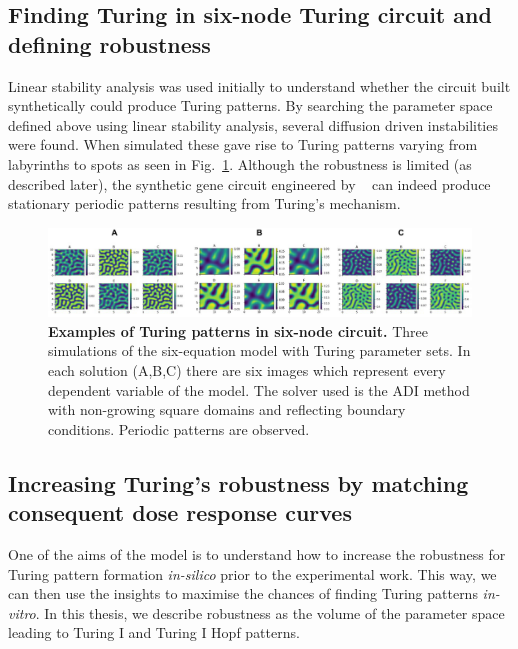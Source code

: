 \subsection{Finding Turing in six-node Turing circuit and defining robustness}
Linear stability analysis was used initially to understand whether the circuit built synthetically could produce Turing patterns.
By searching the parameter space defined above using linear stability analysis, several diffusion driven instabilities were found.
When simulated these gave rise to Turing patterns varying from labyrinths to spots as seen in Fig.~\ref{fig:square_turing}.
Although the robustness is limited (as described later), the synthetic gene circuit engineered by ~\cite{Tica2020} can indeed produce stationary periodic patterns resulting from Turing's mechanism.

\begin{figure}[H]
    \centering
    \includegraphics[width=1\textwidth]{chapters/Chapter 2/square_turing}
    \caption{\textbf{Examples of Turing patterns in six-node circuit.} Three simulations of the six-equation model with Turing parameter sets. In each solution (A,B,C) there are six images which represent every dependent variable of the model. The solver used is the \acrfull{ADI} method with non-growing square domains and reflecting boundary conditions. Periodic patterns are observed. }
    \label{fig:square_turing}
\end{figure}

\subsection{Increasing Turing's robustness by matching consequent dose response curves}\label{balancing}
One of the aims of the model is to understand how to increase the robustness for Turing pattern formation \textit{in-silico} prior to the experimental work.
This way, we can then use the insights to maximise the chances of finding Turing patterns \textit{in-vitro}.
In this thesis, we describe robustness as the volume of the parameter space leading to Turing I and Turing I Hopf patterns.

